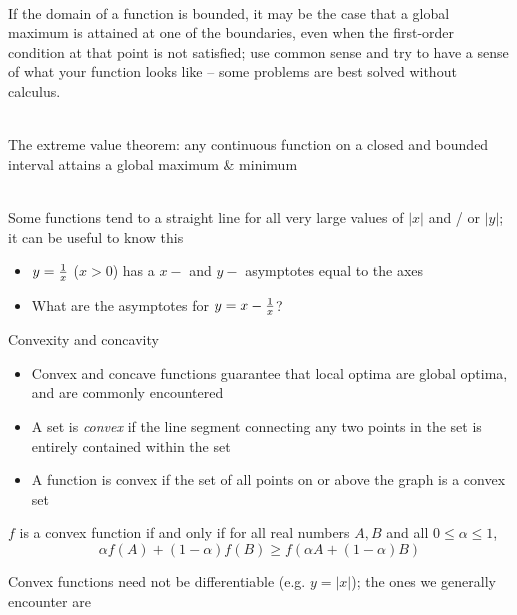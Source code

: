 \documentclass[10pt]{seminar}
\begin{document}
\begin{slide}
\ \\ If the domain of a function is bounded, it may be the case that a global maximum is attained at one of the boundaries, even when the first-order condition at that point is not satisfied; use common sense and try to have a sense of what your function looks like -- some problems are best solved without calculus.

\ \\The extreme value theorem:  any continuous function on a closed and bounded interval attains a global maximum \& minimum

\ \\Some functions tend to a straight line for all very large values of $|x|$ and / or  $|y|$; it can be useful to know this

\begin{itemize}
\item $y={1\over x}$ ($x>0$) has a $x-$ and $y-$ asymptotes equal to the axes
\item What are the asymptotes for $y=x-{1\over x}$? %
\end{itemize}

\newslide Convexity and concavity

\begin{itemize}
\item Convex and concave functions guarantee that local optima are global optima, and are commonly encountered
\item A set is \textit{convex} if the line segment connecting any two points in the set is entirely contained within the set
\item A function is convex if the set of all points on or above the graph is a convex set

\end{itemize}
\begin{center}
\end{center}

\newslide

$f$ is a convex function if and only if for all real numbers $A, B$ and all $0\leq \alpha \leq 1$, 
$$\alpha f(A)+(1-\alpha)f(B)\geq f(\alpha A+(1-\alpha)B)$$

\begin{center}
\end{center}

\newslide

Convex functions need not be differentiable (e.g. $y=|x|$); the ones we generally encounter are



\end{slide}
\end{document}
